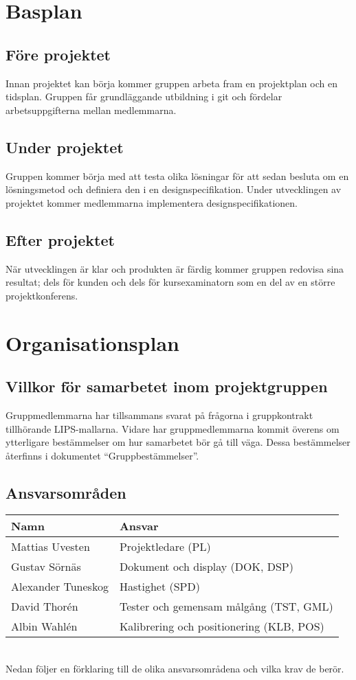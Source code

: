 \documentclass[10pt,swedish,oneside]{lips-no_customer}
\begin{document}
	\section{Basplan}
		\subsection{Före projektet}
		Innan projektet kan börja kommer gruppen arbeta fram en projektplan och en tidsplan. Gruppen får grundläggande utbildning i git och fördelar arbetsuppgifterna mellan medlemmarna.
			
		\subsection{Under projektet}
		Gruppen kommer börja med att testa olika lösningar för att sedan besluta om en lösningsmetod och definiera den i en designspecifikation. Under utvecklingen av projektet kommer medlemmarna implementera designspecifikationen.
		
		\subsection{Efter projektet}
		När utvecklingen är klar och produkten är färdig kommer gruppen redovisa sina resultat; dels för kunden och dels för kursexaminatorn som en del av en större projektkonferens.

	\section{Organisationsplan}
		\subsection{Villkor för samarbetet inom projektgruppen}
		Gruppmedlemmarna har tillsammans svarat på frågorna i gruppkontrakt tillhörande LIPS-mallarna. Vidare har gruppmedlemmarna kommit överens om ytterligare bestämmelser om hur samarbetet bör gå till väga. Dessa bestämmelser återfinns i dokumentet ``Gruppbestämmelser''.
		\subsection{Ansvarsområden}
		\begin{tabular}{|l|l|}
			\hline
			\textbf{Namn} & \textbf{Ansvar}\\
			\hline
			Mattias Uvesten & Projektledare (PL)\\
			\hline
			Gustav Sörnäs & Dokument och display (DOK, DSP)\\
			\hline
			Alexander Tuneskog & Hastighet (SPD)\\
			\hline
			David Thorén & Tester och gemensam målgång (TST, GML)\\
			\hline
			Albin Wahlén & Kalibrering och positionering (KLB, POS)\\
			\hline
		\end{tabular} \\[1em]
		Nedan följer en förklaring till de olika ansvarsområdena och vilka krav de berör.
		
\end{document}
